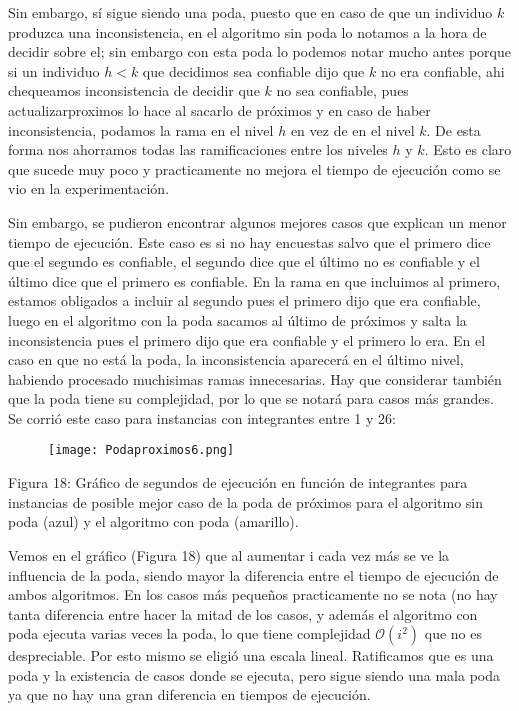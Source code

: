 \documentclass[A4paper,oneside,fleqn,10pt]{article}
\theoremstyle{definition}
\begin{document}
Sin embargo, sí sigue siendo una poda, puesto que en caso de que un individuo $k$ produzca una inconsistencia, en el algoritmo sin poda lo notamos a la hora de decidir sobre el; sin embargo con esta poda lo podemos notar mucho antes porque si un individuo $h<k$ que decidimos sea confiable dijo que $k$ no era confiable, ahi chequeamos inconsistencia de decidir que $k$ no sea confiable, pues actualizarproximos lo hace al sacarlo de próximos y en caso de haber inconsistencia, podamos la rama en el nivel $h$ en vez de en el nivel $k$. De esta forma nos ahorramos todas las ramificaciones entre los niveles $h$ y $k$. Esto es claro que sucede muy poco y practicamente no mejora el tiempo de ejecución como se vio en la experimentación.

Sin embargo, se pudieron encontrar algunos mejores casos que explican un menor tiempo de ejecución. Este caso es si no hay encuestas salvo que el primero dice que el segundo es confiable, el segundo dice que el último no es confiable y el último dice que el primero es confiable. En la rama en que incluimos al primero, estamos obligados a incluir al segundo pues el primero dijo que era confiable, luego en el algoritmo con la poda sacamos al último de próximos y salta la inconsistencia pues el primero dijo que era confiable y el primero lo era. En el caso en que no está la poda, la inconsistencia aparecerá en el último nivel, habiendo procesado muchisimas ramas innecesarias. Hay que considerar también que la poda tiene su complejidad, por lo que se notará para casos más grandes. Se corrió este caso para instancias con integrantes entre 1 y 26:


\begin{figure}[!ht]
  \texttt{[image: Podaproximos6.png]}
    \label{fig:boat17}
      
\end{figure}

\scriptsize

Figura 18: Gráfico de segundos de ejecución en función de integrantes para instancias de posible mejor caso de la poda de próximos para el algoritmo sin poda (azul) y el algoritmo con poda (amarillo).

\normalsize

Vemos en el gráfico (Figura 18) que al aumentar i cada vez más se ve la influencia de la poda, siendo mayor la diferencia entre el tiempo de ejecución de ambos algoritmos. En los casos más pequeños practicamente no se nota (no hay tanta diferencia entre hacer la mitad de los casos, y además el algoritmo con poda ejecuta varias veces la poda, lo que tiene complejidad $\mathcal{O} (i^2)$ que no es despreciable. Por esto mismo se eligió una escala lineal. Ratificamos que es una poda y la existencia de casos donde se ejecuta, pero sigue siendo una mala poda ya que no hay una gran diferencia en tiempos de ejecución.
\end{document}
